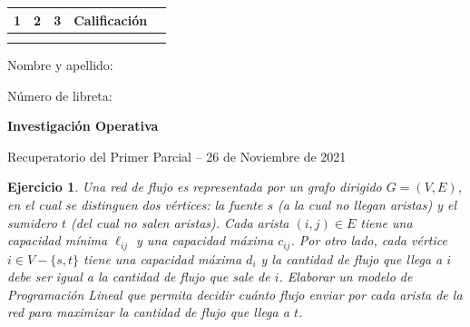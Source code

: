 \documentclass[a4paper,oneside,12pt]{amsart}
\newcommand{\nombremateria}
{Investigaci\'on Operativa}
\newcommand{\numeroparcial}
    { Recuperatorio del Primer Parcial }
\newcommand{\fecha}
    {26 de Noviembre de 2021}
\newtheorem{quest}{Ejercicio}
\begin{document}
\hfill \hfill
\begin{tabular}[c]{|c|c|c|c|c|}
\hline 
1 & 2 & 3 &  Calificaci\'on \\ \hline \hline
\hspace{1.2 cm} & \hspace{1.2 cm} & \hspace{1.2 cm} & \hspace{1.5 cm} \\
\hspace{1.2 cm} & \hspace{1.2 cm} & \hspace{1.2 cm} & \hspace{1.5 cm} \\ \hline

\end{tabular}

\vspace{-1cm}

\noindent Nombre y apellido:

\vspace{0.2cm}

\noindent Número de libreta:

\noindent \hrulefill 

\smallskip
\renewcommand{\baselinestretch}{1.1}

\begin{center}
	\large \textbf{\nombremateria} 
	
	\numeroparcial -- \fecha
\end{center}

\vspace{.6cm}
\renewcommand{\theenumi}{\textbf{\arabic{enumi}}}


\begin{quest}
Una red de flujo es representada por un grafo dirigido $G=(V,E)$, en el cual se distinguen dos vértices: la fuente $s$ (a la cual no llegan aristas) y el sumidero $t$ (del cual no salen aristas). Cada arista $(i,j)\in E$ tiene una capacidad mínima $\ell_{ij}$ y una capacidad máxima $c_{ij}$. Por otro lado, cada vértice $i\in V-\{s,t\}$ tiene una capacidad máxima $d_i$ y la cantidad de flujo que llega a $i$ debe ser igual a la cantidad de flujo que sale de $i$. Elaborar un modelo de Programación Lineal que permita decidir cuánto flujo enviar por cada arista de la red para maximizar la cantidad de flujo que llega a $t$. 
\end{quest}
\end{document}
